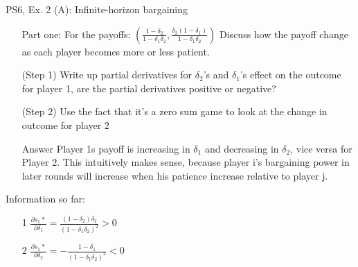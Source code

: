 \begin{frame}{PS6, Ex. 2 (A): Infinite-horizon bargaining}
    \begin{itemize}
    \item[Part one:] For the payoffs: $ \left( \frac{1-\delta_2}{1-\delta_1\delta_2},\frac{\delta_2(1-\delta_1)}{1-\delta_1\delta_2}\right)$ Discuss how the payoff change as each player becomes more or less patient.
    \end{itemize}
    \vfill\null
  \begin{multicols}{2}
    \begin{itemize}
      \item[(Step 1)] Write up partial derivatives for $\delta_2$'s and $\delta_1$'s effect on the outcome for player 1, are the partial derivatives positive or negative?
      \item[(Step 2)] Use the fact that it's a zero sum game to look at the change in outcome for player 2
      \item[Answer] Player 1s payoff is increasing in $\delta_1$ and decreasing in $\delta_2$, vice versa for Player 2. This intuitively makes sense, because player i's bargaining power in later rounds will increase when his patience increase relative to player j.
      \end{itemize}
    \vfill\null \columnbreak
    Information so far:
    \begin{itemize}
    \item[1] $\frac{\partial s_1*}{\partial \delta_1} = \frac{(1-\delta_2)\delta_2}{(1-\delta_1\delta_2)^2}>0 $\\
    \item[2] $\frac{\partial s_1*}{\partial \delta_2} = -\frac{1-\delta_1}{(1-\delta_1\delta_2)^2}<0 $\\
    \end{itemize}
    \vfill\null
  \end{multicols}
\vfill\null
\end{frame}


